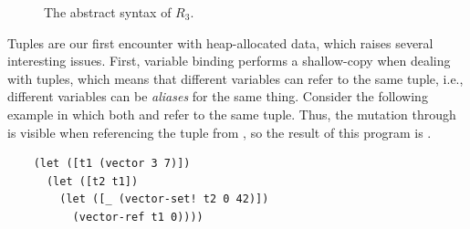 \documentclass[11pt]{book}
\newcommand{\gray}[1]{{\color{lightgray} #1}}
\begin{document}
\begin{figure}[tp]
\centering
\fbox{
\begin{minipage}{0.96\textwidth}
\[
\begin{array}{lcl}
  \itm{bool} &::=& \key{\#t} \mid \key{\#f} \\
  \itm{cmp} &::= & \key{eq?} \mid \key{<} \mid \key{<=} \mid \key{>} \mid \key{>=} \\
\Exp &::=& \gray{ \INT{\Int} \mid \READ{} \mid \NEG{\Exp} } \\
     &\mid& \gray{ \ADD{\Exp}{\Exp} 
      \mid \BINOP{\code{'-}}{\Exp}{\Exp} } \\
     &\mid& \gray{ \VAR{\Var} \mid \LET{\Var}{\Exp}{\Exp} } \\
     &\mid& \gray{ \BOOL{\itm{bool}} 
      \mid \AND{\Exp}{\Exp} }\\
     &\mid& \gray{ \OR{\Exp}{\Exp}
      \mid \NOT{\Exp} } \\
     &\mid& \gray{ \BINOP{\code{'}\itm{cmp}}{\Exp}{\Exp}
      \mid \IF{\Exp}{\Exp}{\Exp} } \\
     &\mid& \VECTOR{\Exp} \\
     &\mid& \VECREF{\Exp}{\Int}\\
     &\mid& \VECSET{\Exp}{\Int}{\Exp}\\
      &\mid& \VOID{} \\
  R_3 &::=& \PROGRAM{\key{'()}}{\Exp}
\end{array}
\]
\end{minipage}
}
\caption{The abstract syntax of $R_3$.}
\label{fig:r3-syntax}
\end{figure}


Tuples are our first encounter with heap-allocated data, which raises
several interesting issues. First, variable binding performs a
shallow-copy when dealing with tuples, which means that different
variables can refer to the same tuple, i.e., different variables can
be \emph{aliases} for the same thing. Consider the following example
in which both  and  refer to the same tuple.  Thus,
the mutation through  is visible when referencing the tuple
from , so the result of this program is .
\begin{center}
\begin{minipage}{0.96\textwidth}
\begin{lstlisting}
    (let ([t1 (vector 3 7)])
      (let ([t2 t1])
        (let ([_ (vector-set! t2 0 42)])
          (vector-ref t1 0))))
\end{lstlisting}
\end{minipage}
\end{center}
\end{document}
